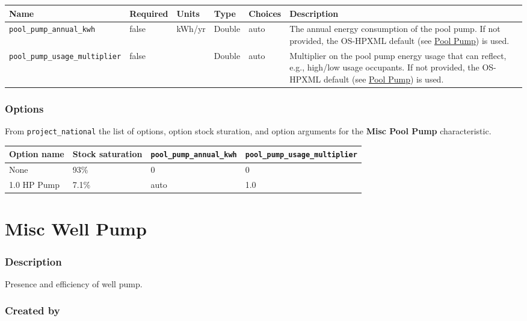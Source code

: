 \begin{longtable}[]{@{}llllll@{}}
\toprule\noalign{}
Name & Required & Units & Type & Choices & Description \\
\midrule\noalign{}
\endhead
\bottomrule\noalign{}
\endlastfoot
\texttt{pool\_pump\_annual\_kwh} & false & kWh/yr & Double & auto & The
annual energy consumption of the pool pump. If not provided, the
OS-HPXML default (see
\href{https://openstudio-hpxml.readthedocs.io/en/v1.7.0/workflow_inputs.html\#pool-pump}{Pool
Pump}) is used. \\
\texttt{pool\_pump\_usage\_multiplier} & false & & Double & auto &
Multiplier on the pool pump energy usage that can reflect, e.g.,
high/low usage occupants. If not provided, the OS-HPXML default (see
\href{https://openstudio-hpxml.readthedocs.io/en/v1.7.0/workflow_inputs.html\#pool-pump}{Pool
Pump}) is used. \\
\end{longtable}

\subsubsection{Options}\label{options-122}

From \texttt{project\_national} the list of options, option stock
sturation, and option arguments for the \textbf{Misc Pool Pump}
characteristic.

\begin{longtable}[]{@{}llll@{}}
\toprule\noalign{}
Option name & Stock saturation & \texttt{pool\_pump\_annual\_kwh} &
\texttt{pool\_pump\_usage\_multiplier} \\
\midrule\noalign{}
\endhead
\bottomrule\noalign{}
\endlastfoot
None & 93\% & 0 & 0 \\
1.0 HP Pump & 7.1\% & auto & 1.0 \\
\end{longtable}

\section{Misc Well Pump}\label{misc_well_pump}

\subsubsection{Description}\label{description-119}

Presence and efficiency of well pump.

\subsubsection{Created by}\label{created-by-120}

